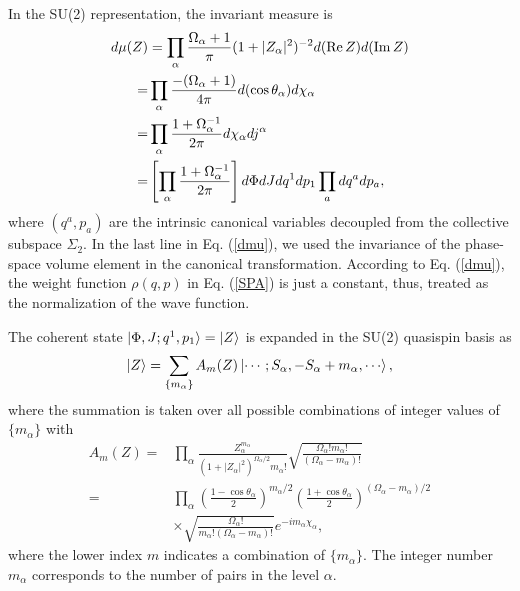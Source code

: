 \documentclass[11pt]{book} %
\begin{document}
In the SU(2) representation, the invariant measure is
\begin{align}
  d\mu(Z) &= \prod_\alpha \frac{\Omega_\alpha+1}{\pi} (1+|Z_\alpha|^2)^{-2} d({\rm Re}\,Z) d({\rm Im}\,Z) \nonumber \\
=& \prod_\alpha \frac{-(\Omega_\alpha+1)}{4\pi} d(\cos{\theta_\alpha}) d\chi_\alpha \nonumber \\
 =& \prod_\alpha \frac{1+\Omega_\alpha^{-1}}{2\pi} d\chi_\alpha dj^\alpha \nonumber \\
 =& \left[ \prod_\alpha \frac{1+\Omega_\alpha^{-1}}{2\pi} \right] d\Phi dJ dq^1 dp_1 %
  \prod_a dq^a dp_a,
	\label{dmu}
\end{align}
where $(q^a,p_a)$ are the intrinsic canonical variables
decoupled from the collective subspace $\Sigma_2$.
In the last line in Eq. (\ref{dmu}),
we used the invariance of the phase-space volume element
in the canonical transformation.
According to Eq. (\ref{dmu}),
the weight function $\rho(q,p)$ in Eq. (\ref{SPA}) is just a constant,
thus, treated as the normalization of the wave function.

The coherent state $\ket{\Phi,J;q^1,p_1}=\ket{Z}$ is
expanded in the SU(2) quasispin basis as
\begin{align}
\ket{Z} &= 
\sum_{\{m_\alpha\}} A_m(Z) \ket{\cdots;S_\alpha,-S_\alpha+m_\alpha,\cdots}, \nonumber\\
\end{align}
where the summation is taken over all possible combinations
of integer values of $\{ m_\alpha\}$ with
\begin{align}
A_m(Z) =& \prod_\alpha 
\frac{Z_\alpha^{m_\alpha}}
	{\left(1+|Z_\alpha|^2\right)^{\Omega_\alpha/2}m_\alpha!}
\sqrt{\frac{\Omega_\alpha! m_\alpha!}{(\Omega_\alpha-m_\alpha)!}} \nonumber\\
 =& \prod_\alpha \left(\frac{1-\cos{\theta}_\alpha}{2}\right)^{m_\alpha/2}\left(\frac{1+\cos{\theta}_\alpha}{2}\right)^{(\Omega_\alpha-m_\alpha)/2}
  \nonumber \\
  &\times\sqrt{\frac{\Omega_\alpha!}{m_\alpha!(\Omega_\alpha-m_\alpha)!}} e^{-i m_\alpha\chi_\alpha}  ,
	\label{A_m}
\end{align}
where the lower index $m$ indicates a combination of $\{ m_\alpha \}$.
The integer number $m_\alpha$ corresponds to the number of pairs
in the level $\alpha$.
%
\end{document}
